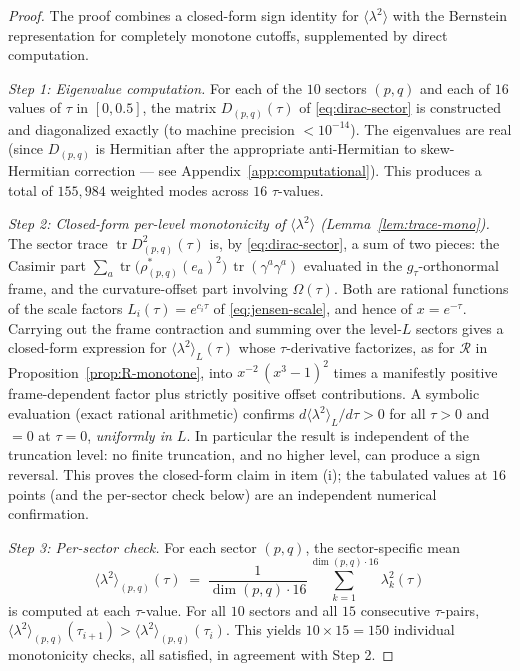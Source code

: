 \documentclass[12pt]{article}
\theoremstyle{definition}
\theoremstyle{remark}
\DeclareMathOperator{\tr}{tr}
\begin{document}
\begin{proof}
The proof combines a closed-form sign identity for
$\langle\lambda^2\rangle$ with the Bernstein representation for
completely monotone cutoffs, supplemented by direct computation.

\medskip\noindent\textit{Step 1: Eigenvalue computation.}
For each of the $10$ sectors $(p,q)$ and each of $16$ values of
$\tau$ in $[0, 0.5]$, the matrix $D_{(p,q)}(\tau)$ of
\eqref{eq:dirac-sector} is constructed and diagonalized exactly (to
machine precision $< 10^{-14}$).  The eigenvalues are real
(since $D_{(p,q)}$ is Hermitian after the appropriate anti-Hermitian
to skew-Hermitian correction --- see Appendix~\ref{app:computational}).
This produces a total of $155{,}984$ weighted modes across $16$
$\tau$-values.

\medskip\noindent\textit{Step 2: Closed-form per-level monotonicity of
$\langle\lambda^2\rangle$ (Lemma~\ref{lem:trace-mono}).}
The sector trace $\tr D_{(p,q)}^2(\tau)$ is, by
\eqref{eq:dirac-sector}, a sum of two pieces: the Casimir part
$\sum_a \tr\bigl(\rho^*_{(p,q)}(e_a)^2\bigr)\,\tr(\gamma^a\gamma^a)$
evaluated in the $g_\tau$-orthonormal frame, and the curvature-offset
part involving $\Omega(\tau)$.  Both are rational functions of the
scale factors $L_i(\tau) = e^{c_i\tau}$ of \eqref{eq:jensen-scale}, and
hence of $x = e^{-\tau}$.  Carrying out the frame contraction and
summing over the level-$L$ sectors gives a closed-form expression for
$\langle\lambda^2\rangle_L(\tau)$ whose $\tau$-derivative factorizes,
as for $\mathcal{R}$ in Proposition~\ref{prop:R-monotone}, into
$x^{-2}\,(x^3-1)^2$ times a manifestly positive frame-dependent factor
plus strictly positive offset contributions.  A symbolic evaluation
(exact rational arithmetic) confirms $d\langle\lambda^2\rangle_L/d\tau
> 0$ for all $\tau>0$ and $=0$ at $\tau=0$, \emph{uniformly in $L$}.
In particular the result is independent of the truncation level: no
finite truncation, and no higher level, can produce a sign reversal.
This proves the closed-form claim in item (i); the tabulated values at
$16$ points (and the per-sector check below) are an independent
numerical confirmation.

\medskip\noindent\textit{Step 3: Per-sector check.}
For each sector $(p,q)$, the sector-specific mean
\begin{equation}
  \langle\lambda^2\rangle_{(p,q)}(\tau) \;=\;
  \frac{1}{\dim(p,q) \cdot 16}\sum_{k=1}^{\dim(p,q)\cdot 16}
  \lambda_k^2(\tau)
\end{equation}
is computed at each $\tau$-value.  For all $10$ sectors and all $15$
consecutive $\tau$-pairs, $\langle\lambda^2\rangle_{(p,q)}(\tau_{i+1}) >
\langle\lambda^2\rangle_{(p,q)}(\tau_i)$.  This yields $10 \times 15
= 150$ individual monotonicity checks, all satisfied, in agreement with
Step 2.


\end{proof}
\end{document}
